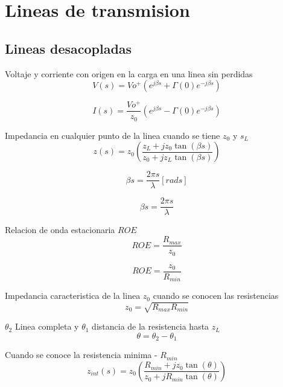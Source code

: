 \documentclass[12pt,letterpaper]{article}
\begin{document}
\newpage
\section{Lineas de transmision}

\subsection{Lineas desacopladas}

Voltaje y corriente con origen en la carga en una linea sin perdidas
\begin{equation}
    V(s)=Vo^{+}(e^{j \beta s}+\Gamma(0)e^{-j \beta s})
\end{equation}

\begin{equation}
    I(s)=\frac{Vo^{+}}{z_0}(e^{j \beta s}-\Gamma(0)e^{-j \beta s})
\end{equation}

Impedancia en cualquier punto de la linea cuando se tiene $z_0$ y $s_L$
\begin{equation}
    z(s)=z_{0}(\frac{z_{L}+jz_{0}\tan(\beta s)}{z_{0}+jz_{L}\tan(\beta s)})
\end{equation}

\begin{equation}
    \beta s=\frac{2 \pi s}{\lambda} [rads]
\end{equation}

\begin{equation}
    \beta s=\frac{2 \pi s}{\lambda}
\end{equation}

Relacion de onda estacionaria $ROE$
\begin{equation}
    ROE=\frac{R_{max}}{z_0}
\end{equation}

\begin{equation}
    ROE=\frac{z_0}{R_{min}}
\end{equation}

Impedancia caracteristica de la linea $z_{0}$ cuando se conocen las resistencias
\begin{equation}
    z_{0}=\sqrt{R_{max} R_{min}}
\end{equation}

$\theta_{2}$ Linea completa y $\theta_{1}$ distancia de la resistencia hasta $z_{L}$
\begin{equation}
    \theta=\theta_2-\theta_1
\end{equation}

Cuando se conoce la resistencia minima - $R_{min}$
\begin{equation}
    z_{int}(s)=z_{0}(\frac{R_{min}+jz_{0}\tan(\theta)}{z_{0}+jR_{min}\tan(\theta)})
\end{equation}
\end{document}
